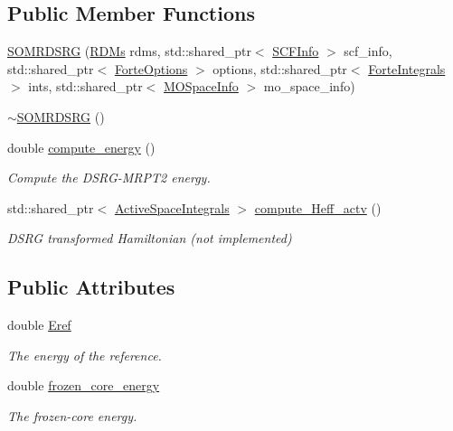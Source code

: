 \subsection*{Public Member Functions}
\begin{DoxyCompactItemize}
\item 
\mbox{\hyperlink{classforte_1_1_s_o_m_r_d_s_r_g_adf536e2ff08708e0a9d20670db58703a}{S\+O\+M\+R\+D\+S\+RG}} (\mbox{\hyperlink{classforte_1_1_r_d_ms}{R\+D\+Ms}} rdms, std\+::shared\+\_\+ptr$<$ \mbox{\hyperlink{classforte_1_1_s_c_f_info}{S\+C\+F\+Info}} $>$ scf\+\_\+info, std\+::shared\+\_\+ptr$<$ \mbox{\hyperlink{classforte_1_1_forte_options}{Forte\+Options}} $>$ options, std\+::shared\+\_\+ptr$<$ \mbox{\hyperlink{classforte_1_1_forte_integrals}{Forte\+Integrals}} $>$ ints, std\+::shared\+\_\+ptr$<$ \mbox{\hyperlink{classforte_1_1_m_o_space_info}{M\+O\+Space\+Info}} $>$ mo\+\_\+space\+\_\+info)
\item 
\mbox{\hyperlink{classforte_1_1_s_o_m_r_d_s_r_g_ac307cf14272218d040400c6df5c948ad}{$\sim$\+S\+O\+M\+R\+D\+S\+RG}} ()
\item 
double \mbox{\hyperlink{classforte_1_1_s_o_m_r_d_s_r_g_a80e229a7a41f301ebab0b8d063f8e243}{compute\+\_\+energy}} ()
\begin{DoxyCompactList}\small\item\em Compute the D\+S\+R\+G-\/\+M\+R\+P\+T2 energy. \end{DoxyCompactList}\item 
std\+::shared\+\_\+ptr$<$ \mbox{\hyperlink{classforte_1_1_active_space_integrals}{Active\+Space\+Integrals}} $>$ \mbox{\hyperlink{classforte_1_1_s_o_m_r_d_s_r_g_a124b4ab351075d25eec777872e3322f5}{compute\+\_\+\+Heff\+\_\+actv}} ()
\begin{DoxyCompactList}\small\item\em D\+S\+RG transformed Hamiltonian (not implemented) \end{DoxyCompactList}\end{DoxyCompactItemize}
\subsection*{Public Attributes}
\begin{DoxyCompactItemize}
\item 
double \mbox{\hyperlink{classforte_1_1_s_o_m_r_d_s_r_g_a6586ef3b607a478bb8bb438d24365a3b}{Eref}}
\begin{DoxyCompactList}\small\item\em The energy of the reference. \end{DoxyCompactList}\item 
double \mbox{\hyperlink{classforte_1_1_s_o_m_r_d_s_r_g_ab8961097bfe98ce28c3ef731b009fc83}{frozen\+\_\+core\+\_\+energy}}
\begin{DoxyCompactList}\small\item\em The frozen-\/core energy. \end{DoxyCompactList}\end{DoxyCompactItemize}
